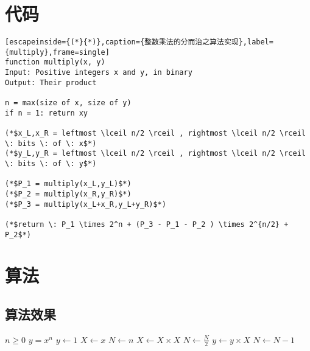 \documentclass[math,logic,quote,code,mode=simple]{codedumpnote}
\begin{document}
\chapter{代码}
\begin{lstlisting}[escapeinside={(*}{*)},caption={整数乘法的分而治之算法实现},label={multiply},frame=single]
function multiply(x, y)
Input: Positive integers x and y, in binary
Output: Their product

n = max(size of x, size of y) 
if n = 1: return xy

(*$x_L,x_R = leftmost \lceil n/2 \rceil , rightmost \lceil n/2 \rceil \: bits \: of \: x$*)
(*$y_L,y_R = leftmost \lceil n/2 \rceil , rightmost \lceil n/2 \rceil \: bits \: of \: y$*)

(*$P_1 = multiply(x_L,y_L)$*)
(*$P_2 = multiply(x_R,y_R)$*)
(*$P_3 = multiply(x_L+x_R,y_L+y_R)$*)

(*$return \: P_1 \times 2^n + (P_3 - P_1 - P_2 ) \times 2^{n/2} + P_2$*)
\end{lstlisting}

\chapter{算法}

\section{算法效果}

\begin{algorithm}
\caption{An algorithm with caption}\label{alg:cap}
\begin{algorithmic}
\Require $n \geq 0$
\Ensure $y = x^n$
\State $y \gets 1$
\State $X \gets x$
\State $N \gets n$
    \State $X \gets X \times X$
    \State $N \gets \frac{N}{2}$  
    \State $y \gets y \times X$
    \State $N \gets N - 1$
\EndIf
\EndWhile
\end{algorithmic}
\end{algorithm}
\end{document}
